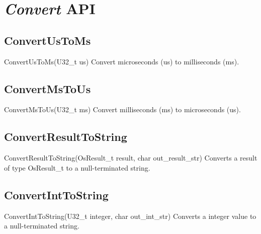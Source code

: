 \section{\textit{Convert} API}

\subsection{ConvertUsToMs}
\label{func:ConvertUsToMs}
\begin{pdfunction}
{ConvertUsToMs(U32\_t us) }
{ 
Convert microseconds (us) to milliseconds (ms). }
\end{pdfunction}

\subsection{ConvertMsToUs}
\label{func:ConvertMsToUs}
\begin{pdfunction}
{ConvertMsToUs(U32\_t ms) }
{ 
Convert milliseconds (ms) to microseconds (us). }
\end{pdfunction}

\subsection{ConvertResultToString}
\label{func:ConvertResultToString}
\begin{pdfunction}
{ConvertResultToString(OsResult\_t result,  char out\_result\_str) }
{ 
Converts a result of type OsResult\_t to a null-terminated 
string.}
\end{pdfunction}

\subsection{ConvertIntToString}
\label{func:ConvertIntToString}
\begin{pdfunction}
{ConvertIntToString(U32\_t integer, char out\_int\_str) }
{ 
Converts a integer value to a null-terminated string. }
\end{pdfunction}

